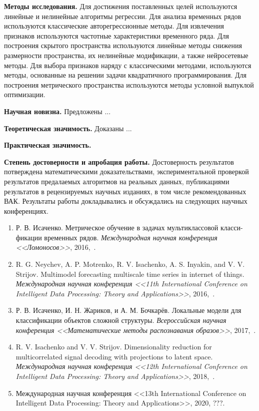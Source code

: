 \vspace{0.5cm}
\textbf{Методы исследования.}
Для достижения поставленных целей используются линейные и нелинейные алгоритмы регрессии.
Для анализа временных рядов используются классические авторегрессионные методы.
Для извлечения признаков используются частотные характеристики временного ряда.
Для построения скрытого пространства используются линейные методы снижения размерности пространства, их нелинейные модификации, а также нейросетевые методы.
Для выбора признаков наряду с классическими методами, используются методы, основанные на решении задачи квадратичного программирования.
Для построения метрического пространства используются методы условной выпуклой оптимизации.

\vspace{0.5cm}
\textbf{Научная новизна.}
{\color{red} Предложены ...}

\vspace{0.5cm}
\textbf{Теоретическая значимость.}
{\color{red} Доказаны ...}

\vspace{0.5cm}
\textbf{Практическая значимость.}

\vspace{0.5cm}
\textbf{Степень достоверности и апробация работы.}
Достоверность результатов потверждена математическими доказательствами, экспериментальной проверкой результатов предалаемых алгоритмов на реальных данных, публикациями результатов в рецензируемых научных изданиях, в том числе рекомендованных ВАК. 
Результаты работы докладывались и обсуждались на следующих научных конференциях.
\begin{enumerate}
	\item Р. В. Исаченко. Метрическое обучение в задачах мультиклассовой класси- фикации временных рядов. \textit{Международная научная конференция <<Ломоносов>>}, 2016,~\cite{isachenko2016lomonosov}.
	\item R. G. Neychev, A. P. Motrenko, R. V. Isachenko, A. S. Inyakin, and V. V. Strijov. Multimodel forecasting multiscale time series in internet of things. \textit{Международная научная конференция  <<11th International Conference on Intelligent Data Processing: Theory and Applications>>}, 2016,~\cite{Neychev2016IDP}.
	\item Р. В. Исаченко, И. Н. Жариков, и А. М. Бочкарёв. Локальные модели для классификации объектов сложной структуры. \textit{Всероссийская научная конференция <<Математические методы распознавания образов>>}, 2017,~\cite{isachenko2017localmmro}.
	\item R. V. Isachenko and V. V. Strijov. Dimensionality reduction for multicorrelated signal decoding with projections to latent space. \textit{Международная научная конференция  <<12th International Conference on Intelligent Data Processing: Theory and Applications>>}, 2018,~\cite{Isachenko2018plsidp}.
	\item Международная научная конференция  <<13th International Conference on Intelligent Data Processing: Theory and Applications>>, 2020, {\color{red} ???}.
\end{enumerate} 

